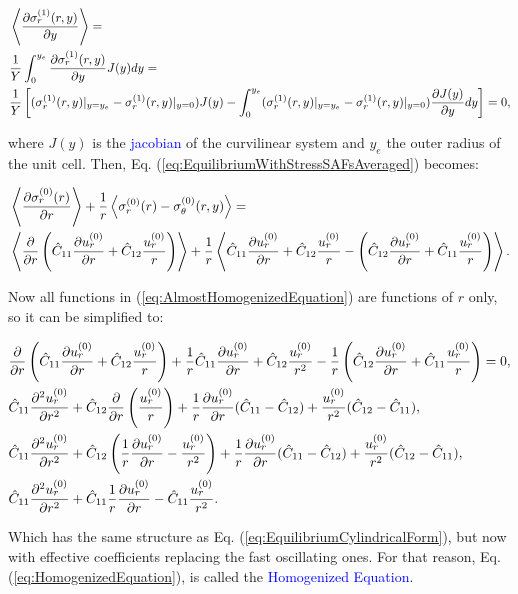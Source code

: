 \begin{equation}
    \begin{aligned}
        &\left\langle\frac{\partial \sigma_r^{(1)}(r,y)}{\partial y}\right\rangle =\\ &\frac{1}{Y}\int_0^{y_e} \frac{\partial \sigma_r^{(1)}(r,y)}{\partial y} J(y)dy =\\&
        \frac{1}{Y}\left[ (\sigma_r^{(1)}(r,y)|_{y=y_e} - \sigma_r^{(1)}(r,y)|_{y=0}) J(y) - \int_0^{y_e}(\sigma_r^{(1)}(r,y)|_{y=y_e} - \sigma_r^{(1)}(r,y)|_{y=0})\frac{\partial J(y)}{\partial y}dy\right] = 0,
    \end{aligned}
\end{equation}

where $J(y)$ is the \textcolor{blue}{jacobian} of the curvilinear system and $y_e$ the outer radius of the unit cell. Then, Eq. (\ref{eq:EquilibriumWithStressSAFsAveraged}) becomes:

\begin{equation}
    \begin{aligned}\label{eq:AlmostHomogenizedEquation}
        &\left\langle \frac{\partial \sigma_r^{(0)}(r)}{\partial r}\right\rangle + \frac{1}{r}\left\langle  \sigma_r^{(0)}(r) - \sigma_{\theta}^{(0)}(r,y)  \right\rangle = \\
        &\left\langle \frac{\partial }{\partial r} \left( \hat{C}_{11} \frac{\partial u_r^{(0)}}{\partial r} + \hat{C}_{12}\frac{u_r^{(0)}}{r} \right)\right\rangle + \frac{1}{r}\left\langle \hat{C}_{11} \frac{\partial u_r^{(0)}}{\partial r} + \hat{C}_{12}\frac{u_r^{(0)}}{r} - \left( \hat{C}_{12} \frac{\partial u_r^{(0)}}{\partial r} + \hat{C}_{11}\frac{u_r^{(0)}}{r} \right)  \right\rangle.
    \end{aligned}
\end{equation}

Now all functions in (\ref{eq:AlmostHomogenizedEquation}) are functions of $r$ only, so it can be simplified to:

\begin{equation}
    \begin{aligned}\label{eq:HomogenizedEquation}
        & \frac{\partial }{\partial r} \left( \hat{C}_{11} \frac{\partial u_r^{(0)}}{\partial r} + \hat{C}_{12}\frac{u_r^{(0)}}{r} \right) + 
        \frac{1}{r} \hat{C}_{11} \frac{\partial u_r^{(0)}}{\partial r} + 
        \hat{C}_{12}\frac{u_r^{(0)}}{r^2} - 
        \frac{1}{r}\left( \hat{C}_{12} \frac{\partial u_r^{(0)}}{\partial r} + \hat{C}_{11}\frac{u_r^{(0)}}{r} \right) = 0, \\
        & \hat{C}_{11}\frac{\partial ^2 u_r^{(0)}}{\partial r^2} + 
        \hat{C}_{12}\frac{\partial }{\partial r}\left( \frac{u_r^{(0)}}{r} \right) + 
        \frac{1}{r} \frac{\partial u_r^{(0)}}{\partial r}(\hat{C}_{11} - \hat{C}_{12}) +
        \frac{u_r^{(0)}}{r^2}(\hat{C}_{12} - \hat{C}_{11}),\\
        & \hat{C}_{11}\frac{\partial ^2 u_r^{(0)}}{\partial r^2} + 
        \hat{C}_{12}\left( \frac1r \frac{\partial u_r^{(0)}}{\partial r} - \frac{u_r^{(0)}}{r^2} \right) + 
        \frac{1}{r} \frac{\partial u_r^{(0)}}{\partial r}(\hat{C}_{11} - \hat{C}_{12}) +
        \frac{u_r^{(0)}}{r^2}(\hat{C}_{12} - \hat{C}_{11}),\\
        & \hat{C}_{11}\frac{\partial ^2 u_r^{(0)}}{\partial r^2} + 
        \hat{C}_{11}\frac{1}{r} \frac{\partial u_r^{(0)}}{\partial r} -
        \hat{C}_{11}\frac{u_r^{(0)}}{r^2}.
    \end{aligned}
\end{equation}

Which has the same structure as Eq. (\ref{eq:EquilibriumCylindricalForm}), but now with effective coefficients replacing the fast oscillating ones. For that reason, Eq. (\ref{eq:HomogenizedEquation}), is called the \textcolor{blue}{Homogenized Equation}.